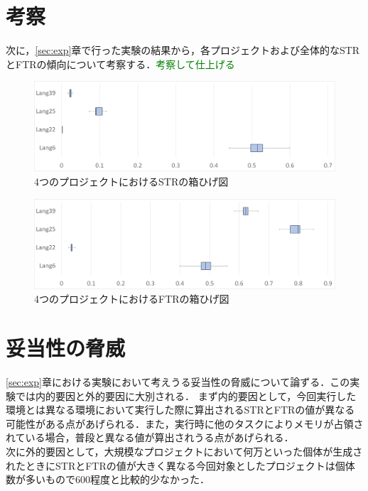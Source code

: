\documentclass[uplatex,dvipdfmx,a4paper]{jsarticle}
\newcommand{\TODO}[1]{{\textcolor{green}{#1}}}
\begin{document}
\section{考察}\label{sec:cons}
次に，\ref{sec:exp}章で行った実験の結果から，各プロジェクトおよび全体的なSTRとFTRの傾向について考察する．\TODO{考察して仕上げる}
\begin{figure}[t]
  \centering
  \includegraphics[width=\linewidth]{fig/summary_STR.png}
  \caption{4つのプロジェクトにおけるSTRの箱ひげ図}
  \label{fig:summary_STR}
\end{figure}
\begin{figure}[t]
  \centering
  \includegraphics[width=\linewidth]{fig/summary_FTR.png}
  \caption{4つのプロジェクトにおけるFTRの箱ひげ図}
  \label{fig:summary_FTR}
\end{figure}

\clearpage
\section{妥当性の脅威}\label{sec:threat}
\ref{sec:exp}章における実験において考えうる妥当性の脅威について論ずる．この実験では内的要因と外的要因に大別される．
まず内的要因として，今回実行した環境とは異なる環境において実行した際に算出されるSTRとFTRの値が異なる可能性がある点があげられる．また，実行時に他のタスクによりメモリが占領されている場合，普段と異なる値が算出されうる点があげられる．\\
次に外的要因として，大規模なプロジェクトにおいて何万といった個体が生成されたときにSTRとFTRの値が大きく異なる今回対象としたプロジェクトは個体数が多いもので600程度と比較的少なかった．
\clearpage
\end{document}
